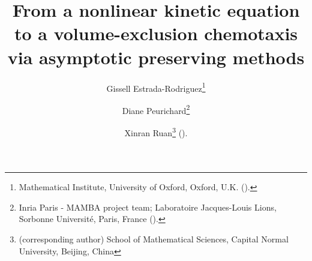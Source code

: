 

\usepackage{lipsum}
\usepackage{amsfonts}
\usepackage{graphicx}
\usepackage{epstopdf}
\usepackage{algorithmic}
\ifpdf
\else
\fi

\newcommand{\creflastconjunction}{, and~}



\title{From a nonlinear kinetic equation to a volume-exclusion chemotaxis via asymptotic preserving methods}


\author{Gissell Estrada-Rodriguez\thanks{Mathematical Institute, University of Oxford, Oxford, U.K. 
  ().}
\and Diane Peurichard\thanks{Inria Paris - MAMBA project team; 
Laboratoire Jacques-Louis Lions, Sorbonne Universit\'e, Paris, France
  ().}
\and Xinran Ruan\thanks{(corresponding author) School of Mathematical Sciences, Capital Normal University, Beijing, China}
().}

\usepackage{amsopn}
\DeclareMathOperator{\diag}{diag}


